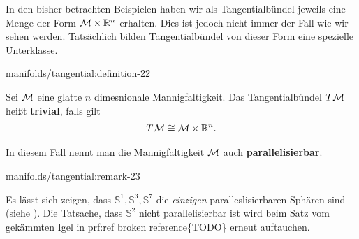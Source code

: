 \par
In den bisher betrachten Beispielen haben wir als Tangentialbündel jeweils eine Menge der Form \(\mathcal{M}\times \mathbb{R}^n\) erhalten.
Dies ist jedoch nicht immer der Fall wie wir sehen werden.
Tatsächlich bilden Tangentialbündel von dieser Form eine spezielle Unterklasse.
\begin{definition}{}{manifolds/tangential:definition-22}



\par
Sei \(\mathcal{M}\) eine glatte \(n\) dimesnionale Mannigfaltigkeit.
Das Tangentialbündel \(T\mathcal{M}\) heißt \textbf{trivial}, falls gilt
\begin{align*}
T\mathcal{M}\cong \mathcal{M}\times\mathbb{R}^n.
\end{align*}
\par
In diesem Fall nennt man die Mannigfaltigkeit \(\mathcal{M}\) auch \textbf{parallelisierbar}.
\end{definition}
\begin{remark}{}{manifolds/tangential:remark-23}



\par
Es lässt sich zeigen, dass \(\mathbb{S}^1, \mathbb{S}^3,\mathbb{S}^7\) die \emph{einzigen} paralleslisierbaren Sphären sind (siehe \cite{Lee03}).
Die Tatsache, dass \(\mathbb{S}^2\) nicht parallelisierbar ist wird beim Satz vom gekämmten Igel in {prf:ref broken reference}\{TODO\} erneut auftauchen.
\end{remark}


